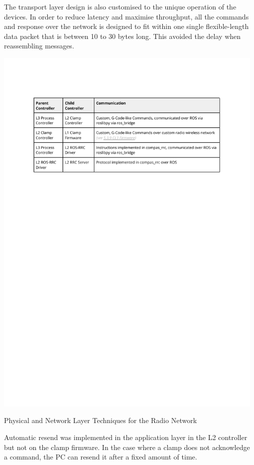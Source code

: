 The transport layer design is also customised to the unique operation of the devices. In order to reduce latency and maximise throughput, all the commands and response over the network is designed to fit within one single flexible-length data packet that is between 10 to 30 bytes long. This avoided the delay when reassembling messages. 


\begin{table}
    \includegraphics[page=10, trim=25.4mm 65mm 25.4mm 33mm, clip, width=0.98\textwidth]{tables/Tables in Chapter 5.pdf}
    \caption{Physical and Network Layer Techniques for the Radio Network}
    \label{table:radio-network-physical-and-network-layer-techniques}
\end{table}

Automatic resend was implemented in the application layer in the L2 controller but not on the clamp firmware. In the case where a clamp does not acknowledge a command, the PC can resend it after a fixed amount of time. 

